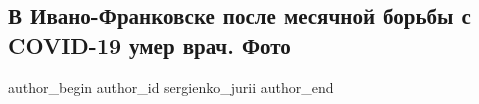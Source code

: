  
 
 
 
 
 
\subsection{В Ивано-Франковске после месячной борьбы с COVID-19 умер врач. Фото}
\label{sec:24_11_2020.news.ua.obozrevatel.sergienko_jurii.1.death_kovid_vrach_ivano_frankovsk}
\ifcmt
	author_begin
   author_id sergienko_jurii
	author_end
\fi
